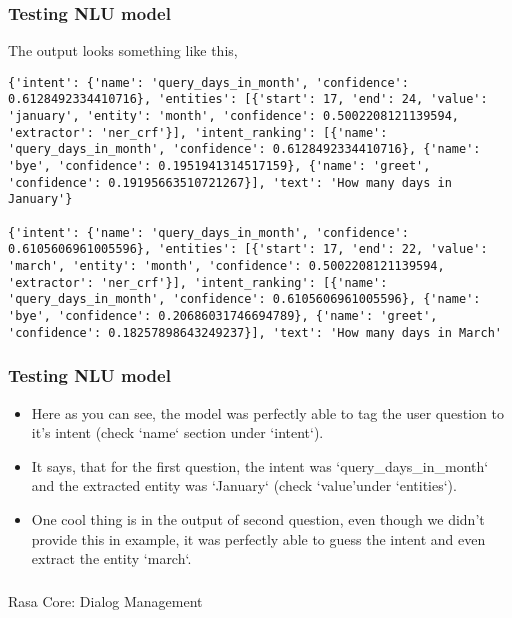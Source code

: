  \begin{frame}[fragile]\frametitle{Testing NLU model}
The output looks something like this,


\begin{lstlisting}
{'intent': {'name': 'query_days_in_month', 'confidence': 0.6128492334410716}, 'entities': [{'start': 17, 'end': 24, 'value': 'january', 'entity': 'month', 'confidence': 0.5002208121139594, 'extractor': 'ner_crf'}], 'intent_ranking': [{'name': 'query_days_in_month', 'confidence': 0.6128492334410716}, {'name': 'bye', 'confidence': 0.1951941314517159}, {'name': 'greet', 'confidence': 0.19195663510721267}], 'text': 'How many days in January'}

{'intent': {'name': 'query_days_in_month', 'confidence': 0.6105606961005596}, 'entities': [{'start': 17, 'end': 22, 'value': 'march', 'entity': 'month', 'confidence': 0.5002208121139594, 'extractor': 'ner_crf'}], 'intent_ranking': [{'name': 'query_days_in_month', 'confidence': 0.6105606961005596}, {'name': 'bye', 'confidence': 0.20686031746694789}, {'name': 'greet', 'confidence': 0.18257898643249237}], 'text': 'How many days in March'
\end{lstlisting}

\end{frame}

 \begin{frame}[fragile]\frametitle{Testing NLU model}

\begin{itemize}
\item Here as you can see, the model was perfectly able to tag the user question to it's intent (check `name` section under `intent`). 
\item It says, that for the first question, the intent was `query\_days\_in\_month` and the extracted entity was `January` (check `value'under `entities`). 
\item One cool thing is in the output of second question, even though we didn't provide this in example, it was perfectly able to guess the intent and even extract the entity `march`.
\end{itemize}
\end{frame}

\begin{frame}[fragile]\frametitle{}
\begin{center}
{\Large Rasa Core: Dialog Management}
\end{center}
\end{frame}


